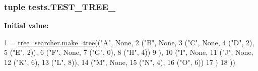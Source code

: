 \subsubsection[{T\+E\+S\+T\+\_\+\+T\+R\+E\+E\+\_\+1}]{\setlength{\rightskip}{0pt plus 5cm}tuple tests.\+T\+E\+S\+T\+\_\+\+T\+R\+E\+E\+\_}\label{namespacetests_ae96acd0761e0cdd19b1884ce62aab012}
{\bfseries Initial value\+:}
\begin{DoxyCode}
1 = \hyperlink{namespacetree__searcher_ad7aa3b2a8e8a2967ca966399c95c9401}{tree\_searcher.make\_tree}((\textcolor{stringliteral}{"A"}, \textcolor{keywordtype}{None},
2                                        (\textcolor{stringliteral}{"B"}, \textcolor{keywordtype}{None},
3                                         (\textcolor{stringliteral}{"C"}, \textcolor{keywordtype}{None},
4                                          (\textcolor{stringliteral}{"D"}, 2),
5                                          (\textcolor{stringliteral}{"E"}, 2)),
6                                         (\textcolor{stringliteral}{"F"}, \textcolor{keywordtype}{None},
7                                          (\textcolor{stringliteral}{"G"}, 0),
8                                          (\textcolor{stringliteral}{"H"}, 4))
9                                         ),
10                                        (\textcolor{stringliteral}{"I"}, \textcolor{keywordtype}{None},
11                                         (\textcolor{stringliteral}{"J"}, \textcolor{keywordtype}{None},
12                                          (\textcolor{stringliteral}{"K"}, 6),
13                                          (\textcolor{stringliteral}{"L"}, 8)),
14                                         (\textcolor{stringliteral}{"M"}, \textcolor{keywordtype}{None},
15                                          (\textcolor{stringliteral}{"N"}, 4),
16                                          (\textcolor{stringliteral}{"O"}, 6))
17                                         )
18                                        ))
\end{DoxyCode}
\hypertarget{namespacetests_ac8a5147066692f8370714f2b2bf0593f}{}
